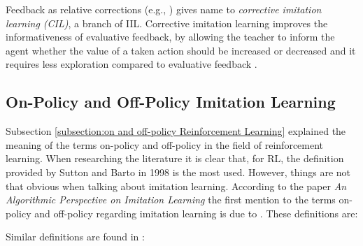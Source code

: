 Feedback as relative corrections (e.g., \cite{Relative-corrections-Celemin:2019}) gives name to \textit{corrective imitation learning (CIL)}, a branch of IIL. Corrective imitation learning improves the informativeness of evaluative feedback, by allowing the teacher to inform the agent whether the value of a taken action should be increased or decreased \cite{Relative-corrections-Celemin:2019} and it requires less exploration compared to evaluative feedback \cite{types-feedback-najar:2020}.


\subsection{On-Policy and Off-Policy Imitation Learning}
\label{subsubsection:on and off-policy Imitation Learning}

Subsection \ref{subsection:on and off-policy Reinforcement Learning} explained the meaning of the terms on-policy and off-policy in the field of reinforcement learning. When researching the literature it is clear that, for RL, the definition provided by Sutton and Barto in 1998 is the most used. However, things are not that obvious when talking about imitation learning. According to the paper \textit{An Algorithmic Perspective on Imitation Learning} \cite{Osa:2018} the first mention to the terms on-policy and off-policy regarding imitation learning is due to \cite{DBLP:journals/corr/LaskeyLHLMFG17}. These definitions are:
\setlength{\parskip}{1em} 


\setlength{\parskip}{1em} 

Similar definitions are found in \cite{CSF-balakrishna:2020}:

 
